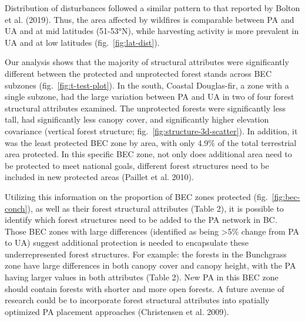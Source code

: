 \documentclass[11pt]{article}
\begin{document}
Distribution of disturbances followed a similar pattern to that reported
by Bolton et al. (2019). Thus, the area affected by wildfires is
comparable between PA and UA and at mid latitudes (51-53°N), while
harvesting activity is more prevalent in UA and at low latitudes
(fig.~\ref{fig:lat-dist}).

Our analysis shows that the majority of structural attributes were
significantly different between the protected and unprotected forest
stands across BEC subzones (fig.~\ref{fig:t-test-plot}). In the south,
Coastal Douglas-fir, a zone with a single subzone, had the large
variation between PA and UA in two of four forest structural attributes
examined. The unprotected forests were significantly less tall, had
significantly less canopy cover, and significantly higher elevation
covariance (vertical forest structure;
fig.~\ref{fig:structure-3d-scatter}). In addition, it was the least
protected BEC zone by area, with only 4.9\% of the total terrestrial
area protected. In this specific BEC zone, not only does additional area
need to be protected to meet national goals, different forest structures
need to be included in new protected areas (Paillet et al. 2010).

Utilizing this information on the proportion of BEC zones protected
(fig.~\ref{fig:bec-conch}), as well as their forest structural
attributes (Table 2), it is possible to identify which forest structures
need to be added to the PA network in BC. Those BEC zones with large
differences (identified as being \textgreater5\% change from PA to UA)
suggest additional protection is needed to encapsulate these
underrepresented forest structures. For example: the forests in the
Bunchgrass zone have large differences in both canopy cover and canopy
height, with the PA having larger values in both attributes (Table 2).
New PA in this BEC zone should contain forests with shorter and more
open forests. A future avenue of research could be to incorporate forest
structural attributes into spatially optimized PA placement approaches
(Christensen et al. 2009).
\end{document}
